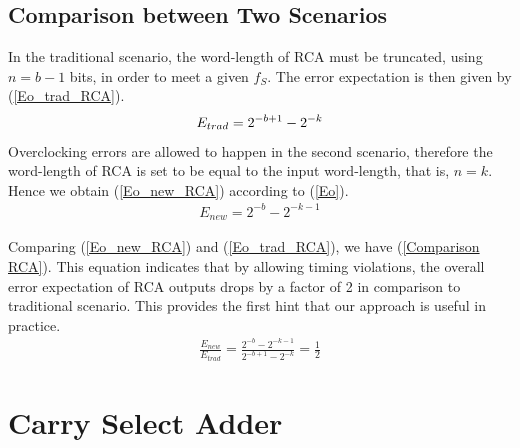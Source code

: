 \documentclass[journal]{IEEEtran}
\begin{document}
\subsection{Comparison between Two Scenarios}\label{section_RCA_Comparison}
In the traditional scenario, the word-length of RCA must be truncated, using $n=b-1$ bits, in order to meet a given $f_S$. The error expectation is then given by (\ref{Eo_trad_RCA}).
%
\begin{eqnarray}\label{Eo_trad_RCA}
  E_{trad}=2^{-b+1}-2^{-k}
  \vspace{-1ex}
\end{eqnarray}
Overclocking errors are allowed to happen in the second scenario, therefore the word-length of RCA is set to be equal to the input word-length, that is, $n=k$. Hence we obtain (\ref{Eo_new_RCA}) according to (\ref{Eo}).
%
\begin{eqnarray}\label{Eo_new_RCA}
  E_{new}=2^{-b}-2^{-k-1}
\end{eqnarray}

%
Comparing (\ref{Eo_new_RCA}) and (\ref{Eo_trad_RCA}), we have (\ref{Comparison RCA}). This equation indicates that by allowing timing violations, the overall error expectation of RCA outputs drops by a factor of 2 in comparison to traditional scenario. This provides the first hint that our approach is useful in practice.
%
\begin{eqnarray}\label{Comparison RCA}
  \frac{E_{new}}{E_{trad}}=\frac{2^{-b}-2^{-k-1}}{2^{-b+1}-2^{-k}}=\frac{1}{2}
\end{eqnarray}



\section{Carry Select Adder}\label{Section_CSA}
\end{document}
